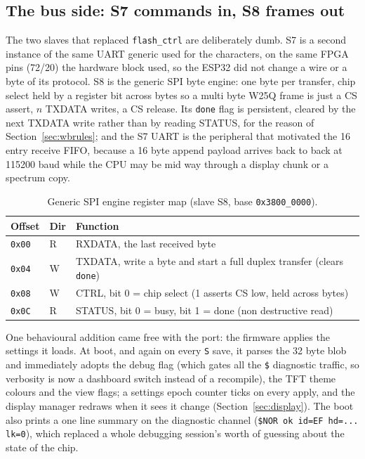 \documentclass[a4paper,11pt]{article}
\begin{document}
\subsection{The bus side: S7 commands in, S8 frames out}

The two slaves that replaced \texttt{flash\_ctrl} are deliberately dumb. S7 is a
second instance of the same UART generic used for the characters, on the same
FPGA pins (72/20) the hardware block used, so the ESP32 did not change a wire or
a byte of its protocol. S8 is the generic SPI byte engine: one byte per
transfer, chip select held by a register bit across bytes so a multi byte W25Q
frame is just a CS assert, $n$ TXDATA writes, a CS release. Its \texttt{done}
flag is persistent, cleared by the next TXDATA write rather than by reading
STATUS, for the reason of Section~\ref{sec:wbrules}; and the S7 UART is the
peripheral that motivated the 16 entry receive FIFO, because a 16 byte append
payload arrives back to back at 115200 baud while the CPU may be mid way through
a display chunk or a spectrum copy.

\begin{table}[H]
\centering
\caption{Generic SPI engine register map (slave S8, base \texttt{0x3800\_0000}).}
\begin{tabular}{lll}
\toprule
\textbf{Offset} & \textbf{Dir} & \textbf{Function} \\
\midrule
\texttt{0x00} & R & RXDATA, the last received byte \\
\texttt{0x04} & W & TXDATA, write a byte and start a full duplex transfer (clears \texttt{done}) \\
\texttt{0x08} & W & CTRL, bit 0 = chip select (1 asserts CS low, held across bytes) \\
\texttt{0x0C} & R & STATUS, bit 0 = busy, bit 1 = done (non destructive read) \\
\bottomrule
\end{tabular}
\end{table}

One behavioural addition came free with the port: the firmware applies the
settings it loads. At boot, and again on every \texttt{S} save, it parses the 32
byte blob and immediately adopts the debug flag (which gates all the \texttt{\$}
diagnostic traffic, so verbosity is now a dashboard switch instead of a
recompile), the TFT theme colours and the view flags; a settings epoch counter
ticks on every apply, and the display manager redraws when it sees it change
(Section~\ref{sec:display}). The boot also prints a one line summary on the
diagnostic channel (\texttt{\$NOR ok id=EF hd=... lk=0}), which replaced a whole
debugging session's worth of guessing about the state of the chip.
\end{document}
